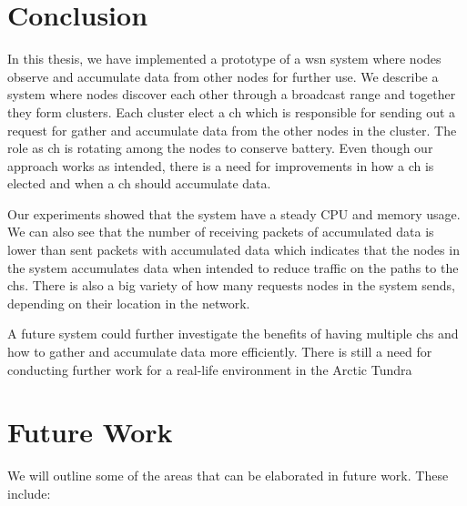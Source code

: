 \documentclass[USenglish]{uit-thesis}
\begin{document}
\chapter{Conclusion}
\glsresetall
In this thesis, we have implemented a prototype of a \gls{wsn} system where nodes observe and accumulate data from other nodes for further use. We describe a system where nodes discover each other through a broadcast range and together they form clusters. Each cluster elect  a \gls{ch} which is responsible for sending out a request for gather and accumulate data from the other nodes in the cluster. The role as \gls{ch} is rotating among the nodes to conserve battery. Even though our approach works as intended, there is a need for improvements in how a \gls{ch} is elected and when a \gls{ch} should accumulate data.

Our experiments showed that the system have a steady CPU and memory usage. We can also see that the number of receiving packets of accumulated data is lower than sent packets with accumulated data which indicates that the nodes in the system accumulates data when intended to reduce traffic on the paths to the \glspl{ch}. There is also a big variety of how many requests nodes in the system sends, depending on their location in the network.

A future system could further investigate the benefits of having multiple \glspl{ch} and how to gather and accumulate data more efficiently. There is still a need for conducting further work for a real-life environment in the Arctic Tundra


\chapter{Future Work}
\glsresetall
We will outline some of the areas that can be elaborated in future work. These include:
\end{document}
